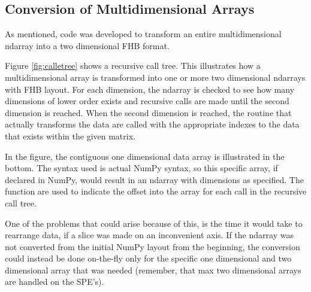 


\subsection{Conversion of Multidimensional Arrays}

As mentioned, code was developed to transform an entire multidimensional ndarray
into a two dimensional FHB format.

Figure \ref{fig:calletree} shows a recursive call tree. This
illustrates how a multidimensional array is transformed into one or
more two dimensional ndarrays with FHB layout. For each dimension, the
ndarray is checked to see how many dimensions of lower order exists
and recursive calls are made until the second dimension is
reached. When the second dimension is reached, the routine that
actually transforms the data are called with the appropriate indexes
to the data that exists within the given matrix.

In the figure, the contiguous one dimensional data array is
illustrated in the bottom. The syntax used is actual NumPy syntax, so
this specific array, if declared in NumPy, would result in an ndarray
with dimensions as specified. The function  are used
to indicate the offset into the array for each call in the recursive
call tree.


One of the problems that could arise because
of this, is the time it would take to rearrange data, if a slice was
made on an inconvenient axis. If the ndarray was not converted from the
initial NumPy layout from the beginning, the conversion could instead
be done on-the-fly only for the specific one dimensional and two dimensional array that was
needed (remember, that max two dimensional arrays are handled on the SPE's).

